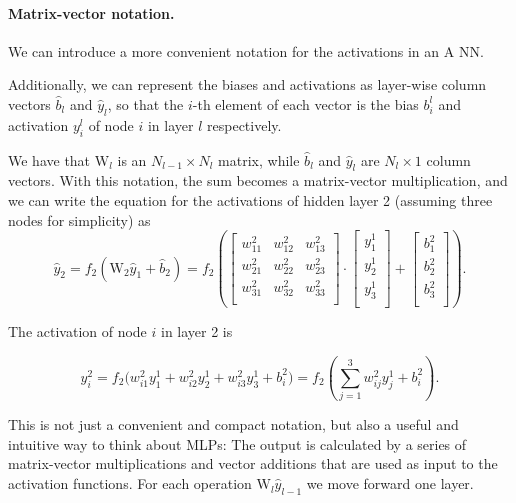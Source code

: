 \documentclass[%
oneside,                 %
final,                   %
10pt]{article}
\begin{document}
\paragraph{Matrix-vector notation.}
We can introduce a more convenient notation for the activations in an A NN. 

Additionally, we can represent the biases and activations
as layer-wise column vectors $\hat{b}_l$ and $\hat{y}_l$, so that the $i$-th element of each vector 
is the bias $b_i^l$ and activation $y_i^l$ of node $i$ in layer $l$ respectively. 

We have that $\mathrm{W}_l$ is an $N_{l-1} \times N_l$ matrix, while $\hat{b}_l$ and $\hat{y}_l$ are $N_l \times 1$ column vectors. 
With this notation, the sum becomes a matrix-vector multiplication, and we can write
the equation for the activations of hidden layer 2 (assuming three nodes for simplicity) as
\begin{equation}
 \hat{y}_2 = f_2(\mathrm{W}_2 \hat{y}_{1} + \hat{b}_{2}) = 
 f_2\left(\left[\begin{array}{ccc}
    w^2_{11} &w^2_{12} &w^2_{13} \\
    w^2_{21} &w^2_{22} &w^2_{23} \\
    w^2_{31} &w^2_{32} &w^2_{33} \\
    \end{array} \right] \cdot
    \left[\begin{array}{c}
           y^1_1 \\
           y^1_2 \\
           y^1_3 \\
          \end{array}\right] + 
    \left[\begin{array}{c}
           b^2_1 \\
           b^2_2 \\
           b^2_3 \\
          \end{array}\right]\right).
\end{equation}


The activation of node $i$ in layer 2 is

\begin{equation}
 y^2_i = f_2\Bigr(w^2_{i1}y^1_1 + w^2_{i2}y^1_2 + w^2_{i3}y^1_3 + b^2_i\Bigr) = 
 f_2\left(\sum_{j=1}^3 w^2_{ij} y_j^1 + b^2_i\right).
\end{equation}

This is not just a convenient and compact notation, but also a useful
and intuitive way to think about MLPs: The output is calculated by a
series of matrix-vector multiplications and vector additions that are
used as input to the activation functions. For each operation
$\mathrm{W}_l \hat{y}_{l-1}$ we move forward one layer.
\end{document}
